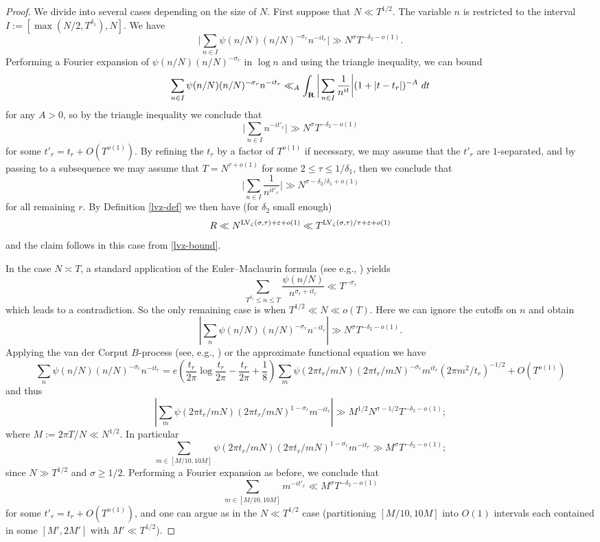 \begin{proof}
We divide into several cases depending on the size of $N$.  First suppose that $N \ll T^{1/2}$.  The variable $n$ is restricted to the interval $I := [\max(N/2, T^{\delta_1}), N]$.  We have
$$ \bigg|\sum_{n \in I} \psi(n/N) (n/N)^{-\sigma_r} n^{-it_r} \bigg| \gg N^\sigma T^{-\delta_2 - o(1)}.$$
Performing a Fourier expansion of $\psi(n/N) (n/N)^{-\sigma_r}$ in $\log n$ and using the triangle inequality, we can bound
$$ \sum_{n \in I} \psi(n/N) (n/N)^{-\sigma_r} n^{-it_r}  \ll_A \int_{\mathbf{R}} \bigg| \sum_{n \in I} \frac{1}{n^{it}} \bigg| (1+|t-t_r|)^{-A}\ dt$$
for any $A>0$, so by the triangle inequality we conclude that
$$ \bigg|\sum_{n \in I} n^{-it'_r} \bigg| \gg N^\sigma T^{-\delta_2 - o(1)}$$
for some $t'_r = t_r + O(T^{o(1)})$.  By refining the $t_r$ by a factor of $T^{o(1)}$ if necessary, we may assume that the $t'_r$ are $1$-separated, and by passing to a subsequence we may assume that $T = N^{\tau+o(1)}$ for some $2 \leq \tau \leq 1/\delta_1$, then
we conclude that
$$ \bigg| \sum_{n \in I} \frac{1}{n^{it'_r}} \bigg| \gg N^{\sigma-\delta_2/\delta_1+o(1)}$$
for all remaining $r$.  By Definition \ref{lvz-def} we then have (for $\delta_2$ small enough)
$$ R \ll N^{\mathrm{LV}_\zeta(\sigma,\tau) + \varepsilon + o(1)} \ll T^{\mathrm{LV}_\zeta(\sigma,\tau)/\tau + \varepsilon + o(1)}$$
and the claim follows in this case from \eqref{lvz-bound}.

In the case $N \asymp T$, a standard application of the Euler--Maclaurin formula (see e.g., \cite[(2.1.2)]{titchmarsh_theory_1986}) yields
$$ \sum_{T^{\delta_1} \leq n \leq T} \frac{\psi(n/N)}{n^{\sigma_r+it_r}} \ll T^{-\sigma_r}$$
which leads to a contradiction.  So the only remaining case is when $T^{1/2} \ll N \ll o(T)$.  Here we can ignore the cutoffs on $n$ and obtain
$$ \left| \sum_{n} \psi(n/N) (n/N)^{-\sigma_r} n^{-it_r}\right| \gg N^{\sigma} T^{-\delta_2-o(1)}.$$
Applying the van der Corput $B$-process (see, e.g., \cite[\S 8.3]{ik}) or the approximate functional equation we have
$$ \sum_{n} \psi(n/N) (n/N)^{-\sigma_r} n^{-it_r} = e(\frac{t_r}{2\pi} \log \frac{t_r}{2\pi} - \frac{t_r}{2\pi} + \frac{1}{8}) \sum_{m} \psi(2\pi t_r/mN) (2\pi t_r/mN)^{-\sigma_r} m^{it_r} (2\pi m^2/t_r)^{-1/2} + O(T^{o(1)})$$
and thus
$$ \left| \sum_{m} \psi(2\pi t_r/mN) (2\pi t_r/mN)^{1-\sigma_r} m^{-it_r} \right| \gg M^{1/2} N^{\sigma-1/2} T^{-\delta_2-o(1)};$$
where $M := 2\pi T/N \ll N^{1/2}$.  In particular
$$ \sum_{m \in [M/10, 10 M]} \psi(2\pi t_r/mN) (2\pi t_r/mN)^{1-\sigma_r} m^{-it_r} \gg M^{\sigma} T^{-\delta_2-o(1)};$$
since $N \gg T^{1/2}$ and $\sigma \geq 1/2$.  Performing a Fourier expansion as before, we conclude that
$$ \sum_{m \in [M/10, 10 M]} m^{-it'_r} \ll M^{\sigma} T^{-\delta_2-o(1)}$$
for some $t'_r = t_r + O(T^{o(1)})$, and one can argue as in the $N \ll T^{1/2}$ case (partitioning $[M/10, 10M]$ into $O(1)$ intervals each contained in some $[M',2M']$ with $M' \ll T^{1/2}$).


\end{proof}
